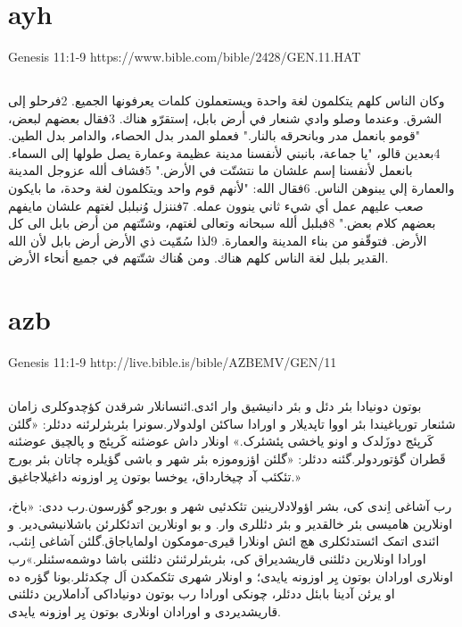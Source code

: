 \documentclass[12pt,fleqn,titlepage,twoside,a4paper]{book}
\begin{document}
\section{ayh}

Genesis 11:1-9 https://www.bible.com/bible/2428/GEN.11.HAT

\begin{arab}[utf]
\section*{}

وكان الناس كلهم يتكلمون لغة واحدة ويستعملون كلمات يعرفونها الجميع. 2فرحلو إلى الشرق. وعندما وصلو وادي شنعار في أرض بابل، إستقرّو هناك. 3فقال بعضهم لبعض، "قومو بانعمل مدر وبانحرقه بالنار." فعملو المدر بدل الحصاء، والدامر بدل الطين. 4بعدين قالو، "يا جماعة، بانبني لأنفسنا مدينة عظيمة وعمارة يصل طولها إلى السماء. بانعمل لأنفسنا إسم علشان ما نتشتّت في الأرض." 5فشاف ألله عزوجل المدينة والعمارة إلي يبنوهن الناس. 6فقال الله: "لأنهم قوم واحد ويتكلمون لغة وحدة، ما بايكون صعب عليهم عمل أي شيء ثاني ينوون عمله. 7فننزل وُنبلبل لغتهم علشان مايفهم بعضهم كلام بعض." 8فبلبل ألله سبحانه وتعالى لغتهم، وشتّتهم من أرض بابل الى كل الأرض. فتوقّفو من بناء المدينة والعمارة. 9لذا سُمّيت ذي الأرض أرض بابل لأن الله القدير بلبل لغة الناس كلهم هناك. ومن هُناك شتّتهم في جميع أنحاء الأرض.

\end{arab}

\section{azb}

 Genesis 11:1-9 http://live.bible.is/bible/AZBEMV/GEN/11

\begin{arab}[utf]

\section*{}

بوتون دونیادا بئر دئل و بئر دانیشیق وار ائدی.ائنسانلار شرقدن کؤچدوکلری زامان شئنعار تورپاغیندا بئر اووا تاپدیلار و اورادا ساکئن اولدولار.سونرا بئربئرلرئنه ددئلر: «گلئن کَرپئج دوزَلدک و اونو یاخشی پئشئرک.» اونلار داش عوضئنه کَرپئج و پالچیق عوضئنه قَطران گؤتوردولر.گئنه ددئلر: «گلئن اؤزوموزه بئر شهر و باشی گؤیلره چاتان بئر بورج تئکئب آد چیخارداق، یوخسا بوتون یِر اوزونه داغیلاجاغیق.»

رب آشاغی اِندی کی، بشر اؤولادلارینین تئکدئیی شهر و بورجو گؤرسون.رب ددی: «باخ، اونلارین هامیسی بئر خالقدیر و بئر دئللری وار. و بو اونلارین اتدئکلرئن باشلانیشی‌دیر. و ائندی اتمک ائستدئکلری هچ ائش اونلارا قیری-مومکون اولمایاجاق.گلئن آشاغی اِنئب، اورادا اونلارین دئلئنی قاریشدیراق کی، بئربئرلرئنئن دئلئنی باشا دوشمه‌سئنلر.»رب اونلاری اورادان بوتون یِر اوزونه یایدی؛ و اونلار شهری تئکمکدن اَل چکدئلر.بونا گؤره ده او یرئن آدینا بابئل ددئلر، چونکی اورادا رب بوتون دونیاداکی آداملارین دئلئنی قاریشدیردی و اورادان اونلاری بوتون یِر اوزونه یایدی.

\end{arab}
\end{document}
